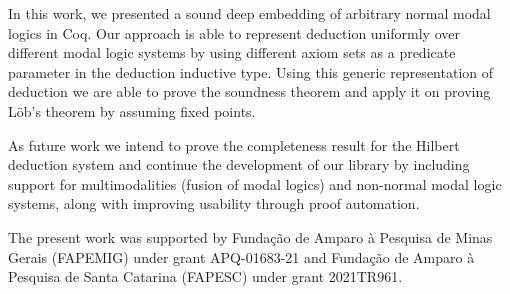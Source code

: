 \documentclass[sigconf]{acmart}
\begin{document}
In this work, we presented a sound deep embedding of arbitrary
normal modal logics in Coq. Our approach is able to represent deduction
uniformly over different modal logic systems by using different axiom sets
as a predicate parameter in the deduction inductive type. Using this generic
representation of deduction we are able to prove the soundness theorem and
apply it on proving L\"ob's theorem by assuming fixed points. %

As future work we intend to prove the completeness result for the Hilbert
deduction system and continue the development of our library by including
support for multimodalities (fusion of modal logics) and non-normal modal
logic systems, along with improving usability through proof automation.

\begin{acks}
  The present work was supported by Fundação de Amparo à Pesquisa de Minas
  Gerais (FAPEMIG) under grant APQ-01683-21 and Fundação de Amparo à Pesquisa de
  Santa Catarina (FAPESC) under grant 2021TR961.
\end{acks}




\end{document}
